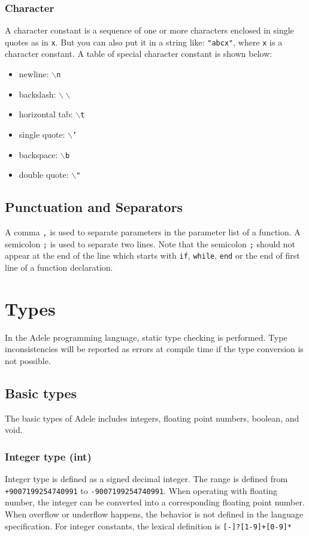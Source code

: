 \documentclass[11pt,letterpaper]{article}
\begin{document}
\subsubsection* {Character}
A character constant is a sequence of one or more characters enclosed in single quotes as in \texttt{x}. But you can also put it in a string like: \texttt{"abcx"}, where \texttt{x} is a character constant. A table of special character constant is shown below:
\begin{itemize}
	\item newline: \texttt{$\backslash$n}
	\item backslash: \texttt{$\backslash\backslash$}              
	\item horizontal tab: \texttt{$\backslash$t}         
    \item single quote: \texttt{$\backslash$'}         
    \item backspace: \texttt{$\backslash$b}             
    \item double quote: \texttt{$\backslash$"}  
\end{itemize}

\subsection {Punctuation and Separators}
A comma \texttt {,} is used to separate parameters in the parameter list of a function. A semicolon \texttt{;} is used to separate two lines. Note that the semicolon \texttt{;} should not appear at the end of the line which starts with \texttt{if}, \texttt{while}, \texttt{end} or the end of first line of a function declaration. 

\section {Types}
In the Adele programming language, static type checking is performed. Type inconsistencies will be reported as errors at compile time if the type conversion is not possible. 

\subsection{Basic types}
The basic types of Adele includes integers, floating point numbers, boolean, and void.

\subsubsection*{Integer type (int)} 
Integer type is defined as a signed decimal integer. The range is defined from \texttt{+9007199254740991} to \texttt{-9007199254740991}. When operating with floating number, the integer can be converted into a corresponding floating point number. When overflow or underflow happens, the behavior is not defined in the language specification. For integer constants, the lexical definition is \texttt{[-]?[1-9]+[0-9]* \textbar [0]}
\end{document}
